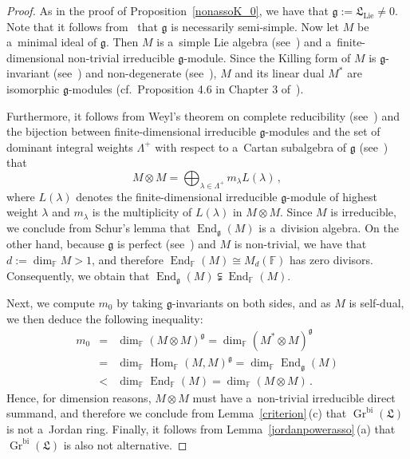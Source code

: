 \documentclass{jonasart}
\DeclareMathOperator{\bi}{bi}
\DeclareMathOperator{\End}{End}
\DeclareMathOperator{\Hom}{Hom}
\DeclareMathOperator{\K}{Gr}
\DeclareMathOperator{\lie}{Lie}
\newcommand{\fbb}{\mathbb{F}}
\newcommand{\gf}{\mathfrak{g}}
\newcommand{\lf}{\mathfrak{L}}
\begin{document}
	\begin{proof}
		As in the proof of Proposition~\ref{nonassoK_0}, we have that $\gf:=
		\lf_{\lie}\ne 0$. Note that it follows from~\cite[Proposition 7.8]{F1} that
		$\gf$ is necessarily semi-simple. Now let $M$ be a~minimal ideal of
		$\gf$. Then $M$ is a~simple Lie algebra (see~\cite[Theorem 5.2]{H})
		and a~finite-dimensional non-trivial irreducible $\gf$-module. Since the Killing form of $M$ is $\gf$-invariant (see~\cite[Lemma~5.1]{H})
		and non-degenerate (see~\cite[Theorem~5.1]{H}), $M$ and its linear dual $M^*$ are isomorphic $\gf$-modules (cf.\ Proposition 4.6 in
		Chapter 3 of~\cite{SF}).

		Furthermore, it follows from Weyl's theorem on complete reducibility
		(see~\cite[Theorem~6.3]{H}) and the bijection between finite-dimensional irreducible $\gf$-modules and the set of dominant integral weights
		$\Lambda^+$ with respect to a~Cartan subalgebra of $\gf$ (see~\cite[Corollary~21.2]{H}) that
		\[
			M\otimes M=\bigoplus_{\lambda\in\Lambda^+}m_\lambda L(\lambda)\,,
		\]
		where $L(\lambda)$ denotes the finite-dimensional irreducible
		$\gf$-module of highest weight $\lambda$ and $m_\lambda$ is the multiplicity of $L(\lambda)$ in $M\otimes M$. Since $M$ is irreducible, we conclude from Schur's lemma that $\End_\gf(M)$ is a~division algebra. On the other hand, because $\gf$ is perfect (see~\cite[Corollary 5.2]{H})
		and $M$ is non-trivial, we have that $d:=\dim_\fbb M>1$, and therefore
		$\End_\fbb(M)\cong M_d (\fbb)$ has zero divisors. Consequently, we obtain that $\End_\gf(M)\subsetneqq\End_\fbb(M)$.

		Next, we compute $m_0$ by taking $\gf$-invariants on both sides, and as $M$ is self-dual, we then deduce the following inequality:
		\begin{eqnarray*}
			m_0 & = & \dim_\fbb(M\otimes M)^\gf=\dim_\fbb(M^*\otimes M)^\gf\\
			& = & \dim_\fbb\Hom_\fbb(M,M)^\gf=\dim_\fbb\End_\gf(M)\\
			& < & \dim_\fbb\End_\fbb(M)=\dim_\fbb(M\otimes M)\,.
		\end{eqnarray*}
		Hence, for dimension reasons, $M\otimes M$ must have a~non-trivial irreducible direct summand, and therefore we conclude from Lemma~\ref{criterion}\,(c)
		that $\K^{\bi} (\lf)$ is not a~Jordan ring. Finally, it follows from Lemma~\ref{jordanpowerasso}\,(a) that $\K^{\bi}(\lf)$ is also not alternative.
	\end{proof}
\end{document}
